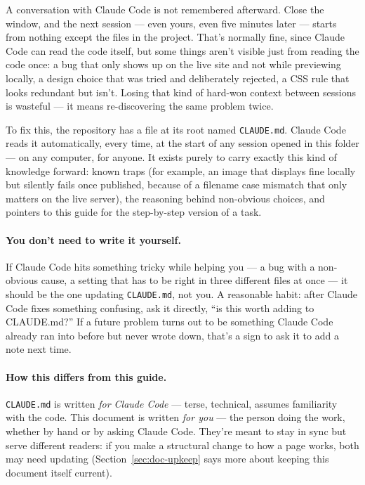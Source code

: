 \documentclass[11pt]{article}
\newcommand{\file}[1]{\texttt{#1}}
\begin{document}
A conversation with Claude Code is not remembered afterward. Close the
window, and the next session --- even yours, even five minutes later ---
starts from nothing except the files in the project. That's normally fine,
since Claude Code can read the code itself, but some things aren't visible
just from reading the code once: a bug that only shows up on the live site
and not while previewing locally, a design choice that was tried and
deliberately rejected, a CSS rule that looks redundant but isn't. Losing
that kind of hard-won context between sessions is wasteful --- it means
re-discovering the same problem twice.

To fix this, the repository has a file at its root named \file{CLAUDE.md}.
Claude Code reads it automatically, every time, at the start of any
session opened in this folder --- on any computer, for anyone. It exists
purely to carry exactly this kind of knowledge forward: known traps (for
example, an image that displays fine locally but silently fails once
published, because of a filename case mismatch that only matters on the
live server), the reasoning behind non-obvious choices, and pointers to
this guide for the step-by-step version of a task.

\paragraph{You don't need to write it yourself.} If Claude Code hits
something tricky while helping you --- a bug with a non-obvious cause, a
setting that has to be right in three different files at once --- it
should be the one updating \file{CLAUDE.md}, not you. A reasonable habit:
after Claude Code fixes something confusing, ask it directly, ``is this
worth adding to CLAUDE.md?'' If a future problem turns out to be something
Claude Code already ran into before but never wrote down, that's a sign to
ask it to add a note next time.

\paragraph{How this differs from this guide.} \file{CLAUDE.md} is written
\emph{for Claude Code} --- terse, technical, assumes familiarity with the
code. This document is written \emph{for you} --- the person doing the
work, whether by hand or by asking Claude Code. They're meant to stay in
sync but serve different readers: if you make a structural change to how a
page works, both may need updating (Section~\ref{sec:doc-upkeep} says more
about keeping this document itself current).
\end{document}
